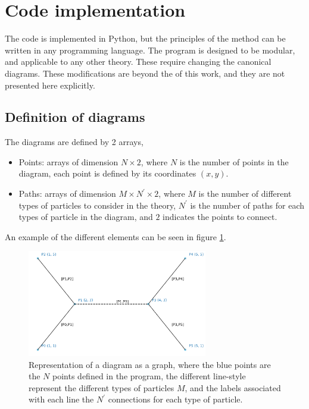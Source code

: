 \documentclass[11pt,a4paper,twoside,pdf]{article}
\numberwithin{equation}{section}
\begin{document}
\newpage

\section{Code implementation} \label{sec:code}

The code is implemented in Python, but the principles of the method can be written in any 
programming language. The program is designed to be modular, and applicable to any
other theory. These require changing the canonical
diagrams. These modifications are beyond the of this work, and they are not presented
here explicitly.

\subsection{Definition of diagrams}

The diagrams are defined by 2 arrays, 
\begin{itemize}
    \item Points: arrays of dimension $N \times 2$, where $N$ is the number of 
    points in the diagram, each point is defined by its coordinates $(x,y)$.
    \item Paths: arrays of dimension $M \times N^\prime \times 2$, where $M$ is the
    number of different types of particles to consider in the theory, $N^\prime$ 
    is the number of paths for each types of particle in the diagram, and $2$ indicates
    the points to connect.
\end{itemize}

An example of the different elements can be seen in figure \ref{fig:diagram_representation}.

\begin{figure}[h!]
    \centering
    \includegraphics[width=0.7\textwidth]{plots/graph_example.png}
    \caption{Representation of a diagram as a graph, where the blue points are the $N$ points
    defined in the program, the different line-style represent the different types of particles 
    $M$, and the labels associated with each line the $N^\prime$ connections 
    for each type of particle.}
    \label{fig:diagram_representation}
\end{figure}
\end{document}
